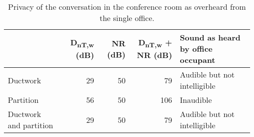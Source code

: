 \begin{table}[htbp]
	\caption{Privacy of the conversation in the conference room as overheard from the single office.}
	\label{tbl:privacy}
	\centering
	\begin{tabular}{@{}lrrrl@{}}
		\toprule
		& D\textsubscript{nT,w} (dB) & NR (dB) & D\textsubscript{nT,w} + NR (dB) & Sound as heard by office occupant \\ \midrule
		 Ductwork & 29 & 50 & 79 & Audible but not intelligible \\
		 Partition & 56 & 50 & 106 & Inaudible \\
		 Ductwork and partition & 29 & 50 & 79 & Audible but not intelligible \\ \bottomrule
	\end{tabular}
\end{table}